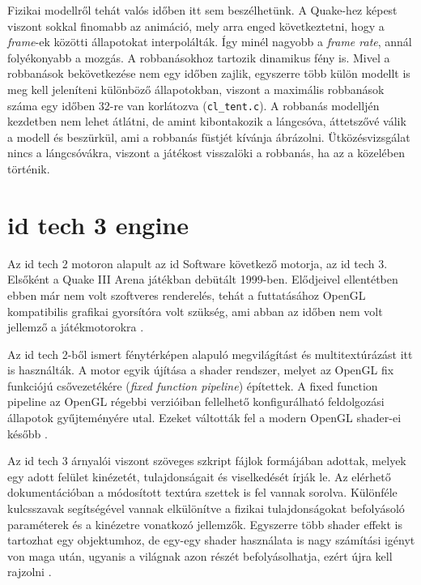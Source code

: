 Fizikai modellről tehát valós időben itt sem beszélhetünk. A Quake-hez képest viszont sokkal finomabb az animáció, mely arra enged következtetni, hogy a \textit{frame}-ek közötti állapotokat interpolálták. Így minél nagyobb a \textit{frame rate}, annál folyékonyabb a mozgás. A robbanásokhoz tartozik dinamikus fény is. Mivel a robbanások bekövetkezése nem egy időben zajlik, egyszerre több külön modellt is meg kell jeleníteni különböző állapotokban, viszont a maximális robbanások száma egy időben 32-re van korlátozva (\texttt{cl\_tent.c}). A robbanás modelljén kezdetben nem lehet átlátni, de amint kibontakozik a lángcsóva, áttetszővé válik a modell és beszürkül, ami a robbanás füstjét kívánja ábrázolni. Ütközésvizsgálat nincs a lángcsóvákra, viszont a játékost visszalöki a robbanás, ha az a közelében történik. 

\section{id tech 3 engine}

Az id tech 2 motoron alapult az id Software következő motorja, az id tech 3. Elsőként a Quake III Arena játékban debütált 1999-ben. Elődjeivel ellentétben ebben már nem volt szoftveres renderelés, tehát a futtatásához OpenGL kompatibilis grafikai gyorsítóra volt szükség, ami abban az időben nem volt jellemző a játékmotorokra \cite{wikiQuake3}.


Az id tech 2-ből ismert fénytérképen alapuló megvilágítást és multitextúrázást itt is használták. A motor egyik újítása a shader rendszer, melyet az OpenGL fix funkciójú csővezetékére (\textit{fixed function pipeline}) építettek. A fixed function pipeline az OpenGL régebbi verzióiban fellelhető konfigurálható feldolgozási állapotok gyűjteményére utal. Ezeket váltották fel a modern OpenGL shader-ei később \cite{fsQuake3}.

Az id tech 3 árnyalói viszont szöveges szkript fájlok formájában adottak, melyek egy adott felület kinézetét, tulajdonságait és viselkedését írják le. Az elérhető dokumentációban a módosított textúra szettek is fel vannak sorolva. Különféle kulcsszavak segítségével vannak elkülönítve a fizikai tulajdonságokat befolyásoló paraméterek és a kinézetre vonatkozó jellemzők. Egyszerre több shader effekt is tartozhat egy objektumhoz, de egy-egy shader használata is nagy számítási igényt von maga után, ugyanis a világnak azon részét befolyásolhatja, ezért újra kell rajzolni \cite{quake3shaderManual}.

